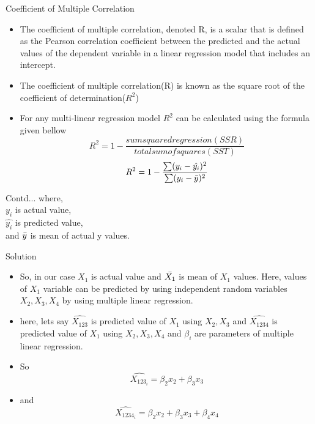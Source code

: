 \documentclass[aspectratio=169,xcolor=dvipsnames]{beamer}
\begin{document}
\begin{frame}{Coefficient of Multiple Correlation}
    \begin{itemize}
        \item The coefficient of multiple correlation, denoted R, is a scalar that is defined as the Pearson correlation coefficient between the predicted and the actual values of the dependent variable in a linear regression model that includes an intercept.
\item The coefficient of multiple correlation(R) is known as the square root of the coefficient of determination(\(R^2\))
\item For any multi-linear regression model \(R^2\) can be calculated using the formula given bellow\\
\begin{equation}
    R^2 = 1 - \frac{sum squared regression (SSR)}{total sum of squares (SST)}
\end{equation}\begin{equation}
    R^2 = 1 - \frac{\sum(y_i - \hat{y_i})^2}{\sum(y_i - \Bar{y})^2}\\
\end{equation}
    \end{itemize}
\end{frame}
\begin{frame}{Contd...}
where,\\
\hspace*{1em} \quad \quad    \(y_i\) is actual value,\\
\hspace*{1em} \quad \quad    \(\hat{y_i}\) is predicted value,\\
\hspace*{1em} \quad \quad    and \(\Bar{y}\) is mean of actual y values.    
\end{frame}
\begin{frame}{Solution}
    \begin{itemize}
        \item So, in our case \(X_1\) is actual value and \(\Bar{X_1}\) is mean of \(X_1\) values. Here, values of \(X_1\) variable can be predicted by using independent random variables \(X_2,X_3,X_4\) by using multiple linear regression.

\item here, lets say \(\hat{X_{123}}\) is predicted value of \(X_1\) using \(X_2, X_3\) and \(\hat{X_{1234}}\) is predicted value of \(X_1\) using \(X_2, X_3,X_4\) and \(\beta_i\) are parameters of multiple linear regression.
\\
\item So \begin{equation}
    \hat{X_{123_i}} = \beta_2x_2  + \beta_3x_3
\end{equation} 
\item and \begin{equation}
\hat{X_{1234_i}} = \beta_2x_2 + \beta_3x_3 + \beta_4x_4    
\end{equation}
    \end{itemize}
\end{frame}
\end{document}
